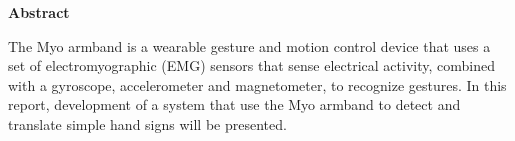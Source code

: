 \vspace*{\fill}
{\centering\huge\bfseries Abstract \par}
The Myo armband is a wearable gesture and motion control device that uses a set of electromyographic (EMG) sensors that sense electrical activity, combined with a gyroscope, accelerometer and magnetometer, to recognize gestures. In this report, development of a system that use the Myo armband to detect and translate simple hand signs will be presented.
\vspace*{\fill}